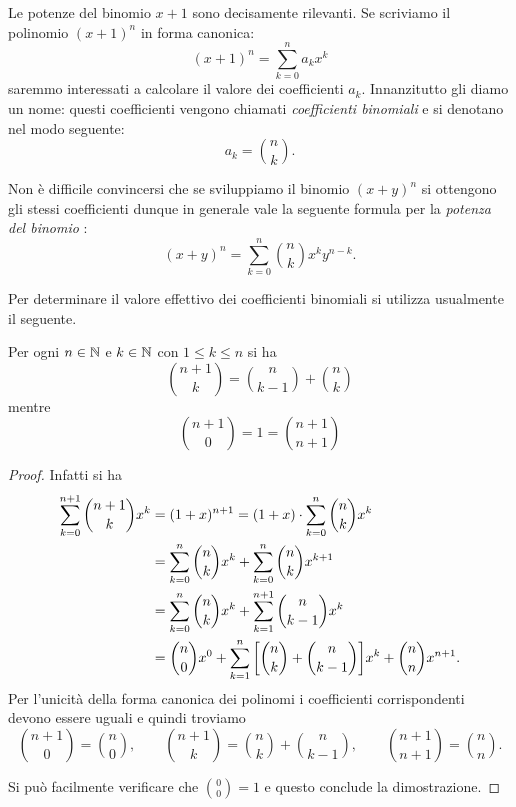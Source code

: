 Le potenze del binomio $x+1$ sono decisamente rilevanti. 
Se scriviamo il polinomio $(x+1)^n$ in forma canonica:
\[
  (x+1)^n = \sum_{k=0}^n a_k x^k  
\]
saremmo interessati a calcolare il valore
dei coefficienti $a_k$. 
Innanzitutto gli diamo un nome: questi coefficienti vengono chiamati 
\emph{coefficienti binomiali}%
%
%
e si denotano nel modo seguente:%
%
\[
    a_k = {n \choose k}.
\]

Non è difficile convincersi che se sviluppiamo il binomio $(x+y)^n$
si ottengono gli stessi coefficienti dunque
in generale vale la seguente formula per la \emph{potenza del binomio}%
%
:
% 
\begin{equation*}
  (x+y)^n = \sum_{k=0}^n {n \choose k} x^k y^{n-k}. 
\end{equation*}

Per determinare il valore effettivo dei coefficienti 
binomiali si utilizza usualmente il seguente.
  
\begin{theorem}
\mymark{*}%
\label{th:tartaglia}%
Per ogni $n\in {\mathbb N}$ e $k \in {\mathbb N}$ con $1 \le k \le n$ si ha
\[
  {n+1 \choose k} =
      {n \choose k-1} + {n \choose k}
\]
mentre
\[
  {n+1 \choose 0} = 1 = {n+1 \choose n+1}
\]
\end{theorem}
  \begin{proof}
  Infatti si ha 
  \begin{align*}
    \sum_{k=0}^{n+1} {n+1 \choose k} x^k
    &= (1+x)^{n+1} 
    = (1+x)\cdot \sum_{k=0}^n {n \choose k} x^k \\
    &= \sum_{k=0}^n {n\choose k} x^k 
    + \sum_{k=0}^n {n\choose k} x^{k+1}\\
    &= \sum_{k=0}^n {n\choose k} x^k 
    + \sum_{k=1}^{n+1} {n\choose k-1} x^{k}\\
    &= {n\choose 0} x^0 
      + \sum_{k=1}^n {\left[ {n\choose k} + {n\choose k-1} \right]} x^k
      + {n \choose n} x^{n+1}.
    \end{align*}
  Per l'unicità della forma canonica dei polinomi 
  i coefficienti corrispondenti devono essere uguali e quindi 
  troviamo
  \[
  {n+1 \choose 0} = {n \choose 0}, \qquad 
  {n+1 \choose k} = {n \choose k} + {n \choose k-1}, \qquad 
  {n+1 \choose n+1} = {n \choose n}.
  \]

  Si può facilmente verificare che  ${0 \choose 0} = 1$ 
  e questo conclude la dimostrazione.
  \end{proof}
  
